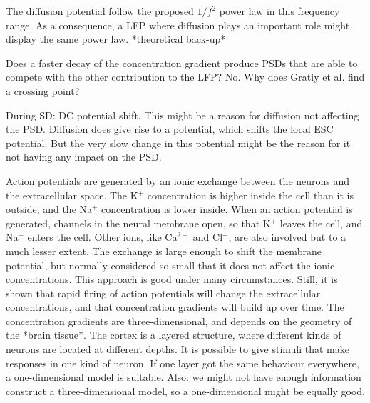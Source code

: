 \documentclass{uiophd}
\begin{document}
The diffusion potential follow the proposed  $1/f^2$ power law in this frequency range. As a consequence, a LFP where diffusion plays an important role might display the same power law.  *theoretical back-up*

Does a faster decay of the concentration gradient produce PSDs that are able to compete with the other contribution to the LFP? No. Why does Gratiy et al. find a crossing point? 


During SD: DC potential shift. This might be a reason for diffusion not affecting the PSD. Diffusion does give rise to a potential, which shifts the local ESC potential. But the very slow change in this potential might be the reason for it not having any impact on the PSD.


Action potentials are generated by an ionic exchange between the neurons and the extracellular space. The K$^+$ concentration is higher inside the cell than it is outside, and the Na$^+$ concentration is lower inside. When an action potential is generated,  channels in the neural membrane open, so that K$^+$ leaves the cell, and Na$^+$ enters the cell. Other ions, like Ca$^{2+}$ and Cl$^-$, are also involved but to a much lesser extent. The exchange is large enough to shift the membrane potential, but normally considered so small that it does not affect the ionic concentrations. This approach is good under many circumstances. Still, it is shown that rapid firing of action potentials will change the extracellular concentrations, and that concentration gradients will build up over time. The concentration gradients are three-dimensional, and depends on the geometry of the *brain tissue*.  The cortex is a layered structure, where different kinds of neurons are located at different depths. It is possible to give stimuli that make responses in one kind of neuron. If one layer got the same behaviour everywhere, a one-dimensional model is suitable. Also: we might not have enough information construct a three-dimensional model, so a one-dimensional might be equally good. 
\end{document}
